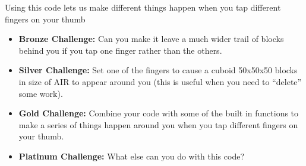 \documentclass{geocraft-worksheet-multipage}
\begin{document}
\noindent Using this code lets us make different things happen when you tap different fingers on your thumb

\begin{itemize}
\item\textbf{Bronze Challenge:} Can you make it leave a much wider trail of blocks behind you if you tap one finger
  rather than the others.

\item\textbf{Silver Challenge:} Set one of the fingers to cause a cuboid 50x50x50 blocks in size of AIR to appear around
  you (this is useful when you need to ``delete'' some work).

\item\textbf{Gold Challenge:} Combine your code with some of the built in functions to make a series of things happen
  around you when you tap different fingers on your thumb. 

\item\textbf{Platinum Challenge:} What else can you do with this code?

\end{itemize}
\end{document}
